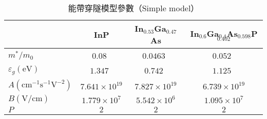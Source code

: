 \begin{table}[h]
\begin{center}
\caption[能帶穿隧模型參數]{能帶穿隧模型參數（Simple model）} \label{t:btb-parameter}
\begin{tabular}{lccc}

\hline
  &  InP  & In$_{0.53}$Ga$_{0.47}$As & In$_{0.6}$Ga$_{0.4}$As$_{0.598}$P$_{0.402}$  \\
\hline
$m^*/m_0$	&  $0.08$~\cite{parks1996theoretical}	&	$0.0463$~\cite{parks1996theoretical}	&	$0.052$~\cite{paul1991empirical}\\
$\varepsilon_g(\mathrm{eV})$ & $1.347$~\cite{pavesi1991temperature} & $0.742$~\cite{paul1991empirical}	&	$1.125$~\cite{benzaquen1994alloy} \\
$A(\mathrm{cm}^{-1}\mathrm{s}^{-1}\mathrm{V}^{-2})$ & $7.641\times10^{19}$ & $7.827\times10^{19}$ & $6.739\times10^{19}$ \\
$B(\mathrm{V}/\mathrm{cm})$ & $1.779\times10^7$ & $5.542\times10^6$ & $1.095\times10^7$ \\
$P$ & $2$ & $2$ & $2$ \\
\hline

\end{tabular}
\end{center}
\end{table}
